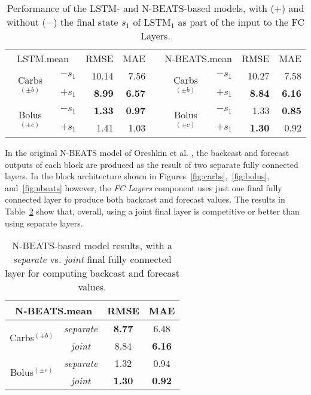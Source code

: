 \begin{table}[ht]
\caption{Performance of the LSTM- and N-BEATS-based models, with ($+$) and without ($-$) the final state $s_1$ of LSTM$_{1}$ as part of the input to the FC Layers.}
\begin{center}
\label{tab:ablation_lstm1}
\small
\begin{tabular}{|c|c|rr|c|c|c|rr|}
    \cline{3-4} \cline{8-9}
    \multicolumn{2}{c|}{LSTM.mean} & RMSE & MAE & \multicolumn{1}{c}{} & \multicolumn{2}{c|}{N-BEATS.mean} & RMSE & MAE\\
    \cline{1-4} \cline{6-9}
    \multirow{2}{*}{Carbs$^{(\pm b)}$} & $- s_1$ & 10.14 & 7.56 & & \multirow{2}{*}{Carbs$^{(\pm b)}$} & $- s_1$ & 10.27 & 7.58\\
    & $+ s_1$ & {\bf 8.99} & {\bf 6.57} & & & $+ s_1$ & {\bf 8.84} & {\bf 6.16}\\
    \cline{1-4} \cline{6-9}
    \multirow{2}{*}{Bolus$^{(\pm c)}$} & $- s_1$ & {\bf 1.33} & {\bf 0.97} & & \multirow{2}{*}{Bolus$^{(\pm c)}$} & $- s_1$ & 1.33 & {\bf 0.85}\\
    & $+ s_1$ & 1.41 & 1.03 & & & $+ s_1$ & {\bf 1.30} & 0.92\\
    \cline{1-4} \cline{6-9}
\end{tabular}
\end{center}
\label{tab:state1}
\end{table}

In the original \ac{N-BEATS} model of Oreshkin et al. \cite{oreshkin:nbeats}, the backcast and forecast outputs of each block are produced as the result of two separate fully connected layers. In the block architecture shown in Figures~\ref{fig:carbs},~\ref{fig:bolus}, and~\ref{fig:nbeats} however, the {\it \ac{FC} Layers} component uses just one final fully connected layer to produce both backcast and forecast values. The results in Table~\ref{tab:splitting} show that, overall, using a joint final layer is competitive or better than using separate layers.

\begin{table}[ht]
\caption{N-BEATS-based model results, with a {\it separate} vs. {\it joint} final fully connected layer for computing backcast and forecast values.}
\begin{center}
\label{tab:ablation_split}
\small
\begin{tabular}{|c|c|c|c|}
	\cline{3-4}
	\multicolumn{2}{c|}{N-BEATS.mean} & RMSE & MAE\\
	\hline
	\multirow{2}{*}{Carbs$^{(\pm b)}$} & {\it separate} & {\bf 8.77} & 6.48\\
	& {\it joint} & 8.84 & {\bf 6.16}\\
	\hline
	\multirow{2}{*}{Bolus$^{(\pm c)}$} & {\it separate} & 1.32 & 0.94\\
	& {\it joint} & {\bf 1.30} & {\bf 0.92}\\
	\hline
\end{tabular}
\end{center}
\label{tab:splitting}
\end{table}

